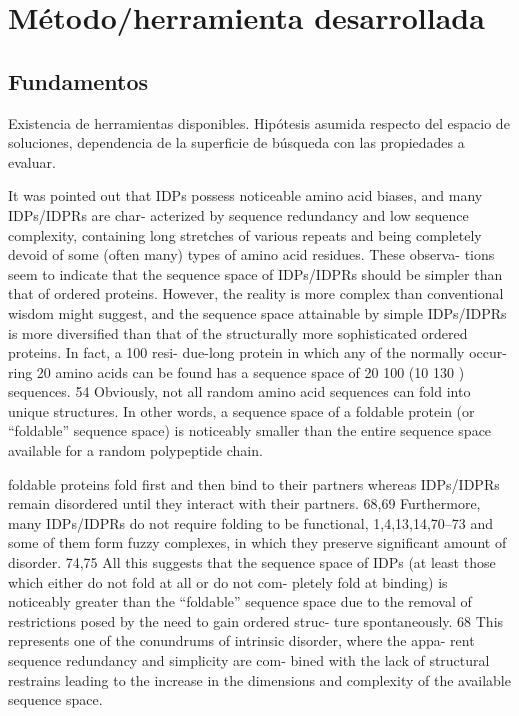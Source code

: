 
\chapter{Método/herramienta desarrollada}
\label{method}


\section{Fundamentos}
Existencia de herramientas disponibles.
Hipótesis asumida respecto del espacio de soluciones, dependencia de la superficie de búsqueda con las propiedades a evaluar.




It was pointed out that IDPs possess noticeable
amino acid biases, and many IDPs/IDPRs are char-
acterized by sequence redundancy and low sequence
complexity, containing long stretches of various
repeats and being completely devoid of some (often
many) types of amino acid residues. These observa-
tions seem to indicate that the sequence space of
IDPs/IDPRs should be simpler than that of ordered
proteins.
However, the reality is more complex than
conventional wisdom might suggest, and the
sequence space attainable by simple IDPs/IDPRs is
more diversified than that of the structurally more
sophisticated ordered proteins.
In fact, a 100 resi-
due-long protein in which any of the normally occur-
ring 20 amino acids can be found has a sequence
space of 20 100 (10 130 ) sequences. 54 Obviously, not
all random amino acid sequences can fold into
unique structures. In other words, a sequence space
of a foldable protein (or “foldable” sequence space) is
noticeably smaller than the entire sequence space
available for a random polypeptide chain.

foldable proteins fold first and
then bind to their partners whereas IDPs/IDPRs
remain disordered until they interact with their
partners. 68,69 Furthermore, many IDPs/IDPRs do
not require folding to be functional, 1,4,13,14,70–73 and
some of them form fuzzy complexes, in which they
preserve significant amount of disorder. 74,75 All this
suggests that the sequence space of IDPs (at least
those which either do not fold at all or do not com-
pletely fold at binding) is noticeably greater than
the “foldable” sequence space due to the removal of
restrictions posed by the need to gain ordered struc-
ture spontaneously. 68 This represents one of the
conundrums of intrinsic disorder, where the appa-
rent sequence redundancy and simplicity are com-
bined with the lack of structural restrains leading to
the increase in the dimensions and complexity of the
available sequence space.

